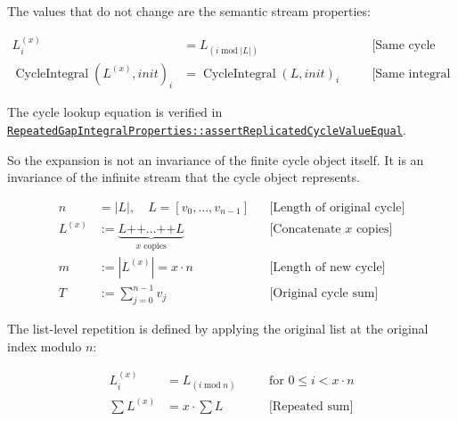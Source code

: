 The values that do not change are the semantic stream properties:

\begin{equation*}
\begin{aligned}
L^{(x)}_i &= L_{(i \operatorname{mod} |L|)}
  \quad &&\text{[Same cycle lookup]} \\
\operatorname{CycleIntegral}(L^{(x)}, init)_i
  &= \operatorname{CycleIntegral}(L, init)_i
  \quad &&\text{[Same integral stream]}
\end{aligned}
\end{equation*}

{\raggedright
The cycle lookup equation is verified in
\href{https://github.com/thiagomata/prime-numbers/blob/integral-cycle-article-v1.0.0/src/main/scala/v1/chapter4/cycle/integral/recursive/properties/RepeatedGapIntegralProperties.scala}{\texttt{RepeatedGapIntegralProperties::\allowbreak assertReplicatedCycleValueEqual}}.
\par}

So the expansion is not an invariance of the finite cycle object itself. It
is an invariance of the infinite stream that the cycle object represents.

\begin{equation*}
\begin{aligned}
n &= |L|, \quad L = [v_0, \dots, v_{n-1}]
  &&\text{[Length of original cycle]} \\
L^{(x)}
&:= \underbrace{L \mathbin{\texttt{++}} \dots \mathbin{\texttt{++}} L}_{x \text{ copies}}
  &&\text{[Concatenate $x$ copies]} \\
m &:= |L^{(x)}| = x \cdot n
  &&\text{[Length of new cycle]} \\
T &:= \sum_{j=0}^{n-1} v_j
  &&\text{[Original cycle sum]}
\end{aligned}
\end{equation*}

The list-level repetition is defined by applying the original list at the
original index modulo $n$:

\begin{equation*}
\begin{aligned}
L^{(x)}_i &= L_{(i \operatorname{mod} n)}
  \quad &&\text{for } 0 \le i < x \cdot n \\
\sum L^{(x)} &= x \cdot \sum L
  \quad &&\text{[Repeated sum]}
\end{aligned}
\end{equation*}

